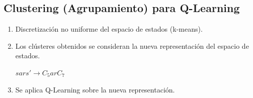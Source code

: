 \documentclass[12pt]{report} %
\begin{document}
\subsection{Clustering (Agrupamiento) para Q-Learning}
\begin{enumerate}
  \item Discretización no uniforme del espacio de estados (k-means).
  \item Los clústeres obtenidos se consideran la nueva representación del espacio de estados.
  
  $sars' \rightarrow C_5arC_7$
  \item Se aplica Q-Learning sobre la nueva representación.
\end{enumerate}
\end{document}
